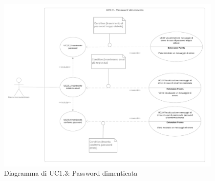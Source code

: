 \begin{figure}[H]
    \centering
    \includegraphics[scale=0.2]{Immagini/DiagrammiUC/UC1.3PasswordDimenticata.png}
    \caption{Diagramma di UC1.3: Password dimenticata} 
    \label{fig:PasswordDimenticata}
\end{figure}

